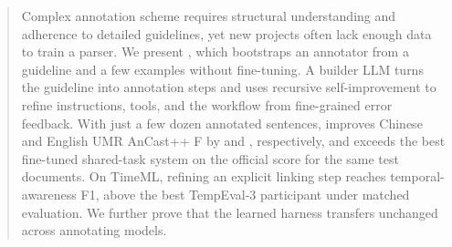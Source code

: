 \begin{abstract}
Complex annotation scheme requires structural understanding and adherence to detailed guidelines, yet new projects often lack enough data to train a parser. We present \sys, which bootstraps an annotator from a guideline and a few examples without fine-tuning. A builder LLM turns the guideline into annotation steps and uses recursive self-improvement to refine instructions, tools, and the workflow from fine-grained error feedback. With just a few dozen annotated sentences, \sys improves Chinese and English UMR AnCast++ F by \gainLearnedZh{} and \gainLearnedEn{}, respectively, and exceeds the best fine-tuned shared-task system on the official score for the same test documents. On TimeML, refining an explicit linking step reaches \lnkLinkRsiOne{} temporal-awareness F1, above the best TempEval-3 participant under matched evaluation. We further prove that the learned harness transfers unchanged across annotating models.
\end{abstract}